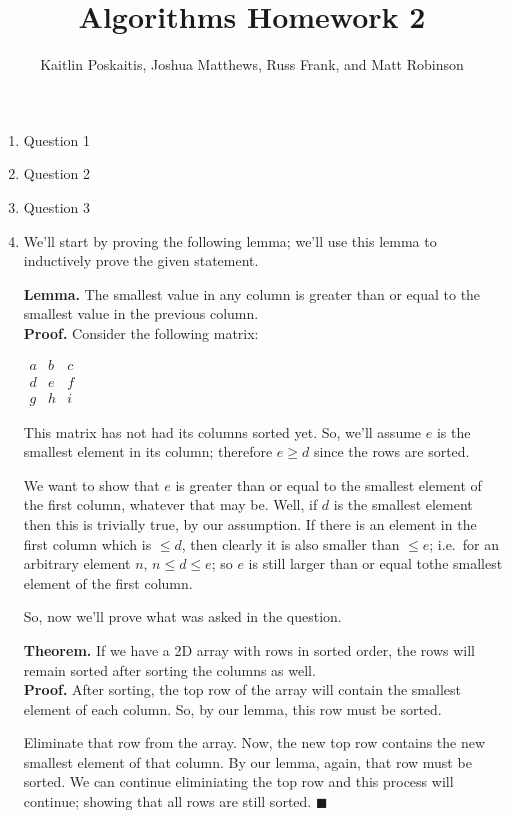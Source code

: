 \documentclass[12pt]{article}
\title{\bf Algorithms Homework 2}
\author{Kaitlin Poskaitis, Joshua Matthews, Russ Frank, and Matt Robinson}
\date{}
\begin{document}
\maketitle

\begin{enumerate}

\item Question 1

\item Question 2

\item Question 3

\item 

  We'll start by proving the following lemma; we'll use this lemma to
  inductively prove the given statement.

  \textbf{Lemma.} The smallest value in any column is greater than or equal to
  the smallest value in the previous column.\\
  \textbf{Proof.} Consider the following matrix:

  $\begin{matrix}
    a & b & c \\
    d & e & f \\
    g & h & i
  \end{matrix}$

  This matrix has not had its columns sorted yet. So, we'll assume $e$ is the
  smallest element in its column; therefore $e \ge d$ since the rows are sorted.

  We want to show that $e$ is greater than or equal to the smallest element of the first
  column, whatever that may be. Well, if $d$ is the smallest element then this
  is trivially true, by our assumption. If there is an element in the first
  column which is $\le d$, then clearly it is also smaller than $\le e$;
  i.e.\ for an arbitrary element $n$, $n \le d \le e$; so $e$ is still larger 
  than or equal tothe smallest element of the first column.

  So, now we'll prove what was asked in the question.

  \textbf{Theorem.} If we have a 2D array with rows in sorted order, the rows
  will remain sorted after sorting the columns as well. \\
  \textbf{Proof.} After sorting, the top row of the array will contain the
  smallest element of each column. So, by our lemma, this row must be sorted.

  Eliminate that row from the array. Now, the new top row contains the new
  smallest element of that column. By our lemma, again, that row must be
  sorted. We can continue eliminiating the top row and this process will
  continue; showing that all rows are still sorted. $\blacksquare$

\end{enumerate}
\end{document}
